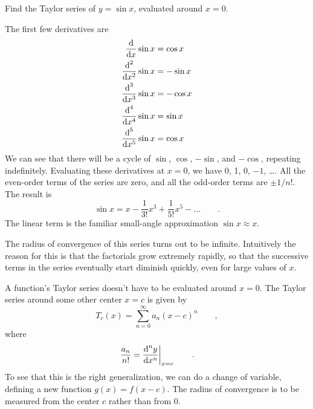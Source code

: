 \begin{eg}\label{eg:taylor-sin}
\egquestion Find the Taylor series of $y=\sin x$, evaluated around $x=0$.

\eganswer  The first few derivatives are
\begin{align*}
  \frac{\textup{d}}{\textup{d} x}\sin x &= \cos x \\
  \frac{\textup{d}^2}{\textup{d} x^2}\sin x &= -\sin x\\
  \frac{\textup{d}^3}{\textup{d} x^3}\sin x &= -\cos x\\
  \frac{\textup{d}^4}{\textup{d} x^4}\sin x &= \sin x\\
  \frac{\textup{d}^5}{\textup{d} x^5}\sin x &= \cos x
\end{align*}
We can see that there will be a cycle of $\sin$, $\cos$, $-\sin$, and $-\cos$, repeating
indefinitely. Evaluating these derivatives at $x=0$, we have
0, 1, 0, $-1$, \ldots. All the even-order terms of the series are zero, and all the odd-order
terms are $\pm1/n!$. The result is
\begin{equation*}
  \sin x = x - \frac{1}{3!}x^3 + \frac{1}{5!}x^5 - \ldots \qquad .
\end{equation*}
The linear term is the familiar small-angle approximation $\sin x\approx x$.

The radius of convergence of this series turns out to be infinite. Intuitively the reason for
this is that the factorials grow extremely rapidly, so that the successive terms in the series eventually start
diminish quickly, even for large values of $x$.
\end{eg}

A function's Taylor series doesn't have to be evaluated around $x=0$. The Taylor series around some other
center $x=c$ is given by
\begin{equation*}
  T_c(x) = \sum_{n=0}^\infty a_n (x-c)^n \qquad ,
\end{equation*}
where 
\begin{equation*}
  \left. \frac{a_n}{n!} = \frac{\textup{d}^n y}{\textup{d} x^n}\right|_{x=c} \qquad .
\end{equation*}
To see that this is the right generalization, we can do a change of variable,
defining a new function $g(x)=f(x-c)$. The radius of convergence is to be measured
from the center $c$ rather than from 0.

